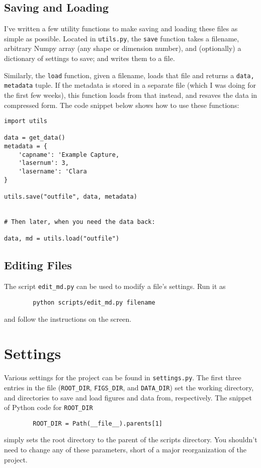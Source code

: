 \documentclass{article}
\newcommand{\code}{\texttt}
\begin{document}
    \subsection{Saving and Loading}
    I've written a few utility functions to make saving and loading these files as simple as possible. Located in \code{utils.py}, the \code{save} function takes a filename, arbitrary Numpy array (any shape or dimension number), and (optionally) a dictionary of settings to save; and writes them to a file.

    Similarly, the \code{load} function, given a filename, loads that file and returns a \code{data, metadata} tuple. If the metadata is stored in a separate file (which I was doing for the first few weeks), this function loads from that instead, and resaves the data in compressed form. The code snippet below shows how to use these functions: 

    \begin{lstlisting}
import utils

data = get_data()
metadata = {
    'capname': 'Example Capture,
    'lasernum': 3,
    'lasername': 'Clara
}

utils.save("outfile", data, metadata)


# Then later, when you need the data back:

data, md = utils.load("outfile")
    \end{lstlisting}

    \subsection{Editing Files}
    The script \code{edit\_md.py} can be used to modify a file's settings. Run it as
    \begin{lstlisting}
        python scripts/edit_md.py filename
    \end{lstlisting}
    and follow the instructions on the screen.

    \section{Settings}
    Various settings for the project can be found in \code{settings.py}. The first three entries in the file (\code{ROOT\_DIR}, \code{FIGS\_DIR}, and \code{DATA\_DIR}) set the working directory, and directories to save and load figures and data from, respectively. The snippet of Python code for \code{ROOT\_DIR}
    \begin{lstlisting}
        ROOT_DIR = Path(__file__).parents[1]
    \end{lstlisting}
    simply sets the root directory to the parent of the scripts directory. You shouldn't need to change any of these parameters, short of a major reorganization of the project.
\end{document}
